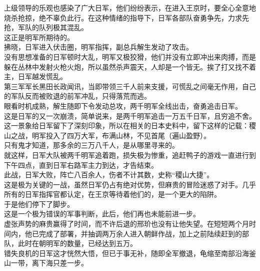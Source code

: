 \begin{multicols}{\theparacolNo}
上级领导的乐观也感染了广大日军，他们纷纷表示，在进入王京时，要全心全意地烧杀抢掠，绝不辜负此行。在这种情绪的指导下，日军各部队奋勇争先，力求先抢，军队的队列极其混乱。\\

这正是明军所期待的。\\

拂晓，日军进入伏击圈，明军指挥，副总兵解生发动了攻击。\\

没有思想准备的日军顿时大乱，明军又极狡猾，他们并没有立即冲出来肉搏，而是躲在丛林中发射火枪火炮，所以虽然杀声震天，人却是一个皆无。挨了打又找不着主，日军越发慌乱。\\

第三军军长黑田长政闻讯，当即带领三千人前来支援，可慌乱之间毫无作用，自己的军队反而被败退的前军冲乱，只得落荒而逃。\\

眼看时机成熟，解生随即下令发动总攻，两千明军全线出击，奋勇追击日军。\\

这是日军的又一次崩溃，简单说来，是两千明军追击一万五千日军，且穷追不舍。这一景象给日军留下了深刻印象，所以在相关的日本史料中，留下这样的记载：稷山之战，明军投入了四万大军，布满山林，不见首尾（遍山盈野）。\\

只有鬼才知道，那多余的三万八千人，是从哪里寻来的。\\

就这样，日军大队被两千明军追着跑，损失极为惨重，追赶鸭子的游戏一直进行到下午四点，直到日军右路军主力到达，才告结束。\\

此战，日军大败，阵亡八百余人，伤者不计其数，史称“稷山大捷”。\\

这是极为关键的一战，虽然日军仍占有绝对优势，但麻贵的冒险迷惑了对手。几乎所有的日军指挥官都认定，在王京等待着他们的，是一个更大的陷阱。\\

于是他们停下了脚步。\\

这是一个极为错误的军事判断，此后，他们再也未能前进一步。\\

虚张声势的麻贵赢得了时间，而不许后退的邢玠也没有让他失望。在短短两个月时间内，他已完成了部署，并抽调两万余人进入朝鲜作战，加上之前陆续赶到的部队，此时在朝明军的数量，已经达到五万。\\

错失良机的日军这才恍然大悟，但已于事无补，随即全军撤退，龟缩至南部沿海釜山一带，离下海只差一步。\\


\end{multicols}
